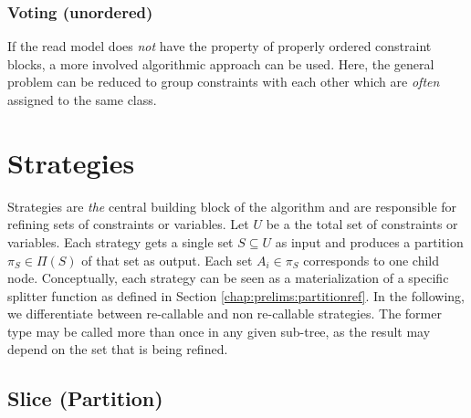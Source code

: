 			\subsubsection{Voting (unordered)}
			\label{chap:tree:classifiers:cooccurence}
			
				If the read model does \textit{not} have the property of properly ordered constraint blocks, a more involved algorithmic approach can be used.
				Here, the general problem can be reduced to group constraints with each other which are \textit{often} assigned to the same class.
					
				\clearpage
		
%	
%			
		
	\section{Strategies}
	\label{chap:tree:strategies}
	
		Strategies are \textit{the} central building block of the algorithm and are responsible for refining sets of constraints or variables.
		Let $U$ be a the total set of constraints or variables.
		Each strategy gets a single set $S \subseteq U$ as input and produces a partition $\pi_S \in \Pi(S)$ of that set as output.
		Each set $A_i \in \pi_S$ corresponds to one child node.
		Conceptually, each strategy can be seen as a materialization of a specific splitter function as defined in Section \ref{chap:prelims:partitionref}.
		In the following, we differentiate between re-callable and non re-callable strategies. The former type may be called more than once in any given sub-tree, as the result may depend on the set that is being refined.
		
		\clearpage
	
		\subsection{Slice (Partition)}
		\label{chap:tree:strategies:slice:part}
		
